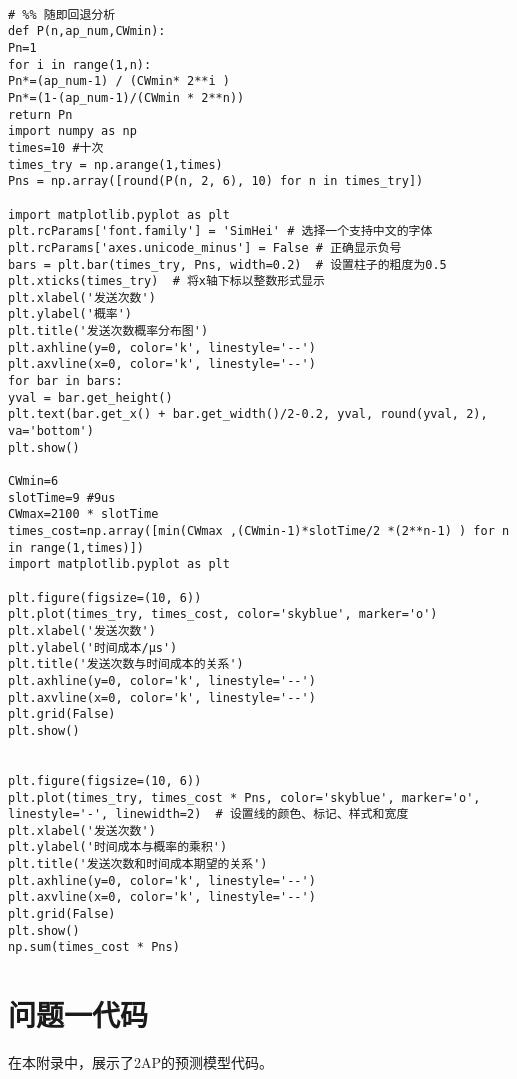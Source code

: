 \documentclass[bwprint,fontset=windows]{gmcmthesis}
\begin{document}
\begin{lstlisting}

# %% 随即回退分析
def P(n,ap_num,CWmin):
Pn=1
for i in range(1,n):
Pn*=(ap_num-1) / (CWmin* 2**i )
Pn*=(1-(ap_num-1)/(CWmin * 2**n))
return Pn
import numpy as np
times=10 #十次
times_try = np.arange(1,times)
Pns = np.array([round(P(n, 2, 6), 10) for n in times_try])

import matplotlib.pyplot as plt
plt.rcParams['font.family'] = 'SimHei' # 选择一个支持中文的字体
plt.rcParams['axes.unicode_minus'] = False # 正确显示负号
bars = plt.bar(times_try, Pns, width=0.2)  # 设置柱子的粗度为0.5
plt.xticks(times_try)  # 将x轴下标以整数形式显示
plt.xlabel('发送次数')
plt.ylabel('概率')
plt.title('发送次数概率分布图')
plt.axhline(y=0, color='k', linestyle='--')
plt.axvline(x=0, color='k', linestyle='--')
for bar in bars:
yval = bar.get_height()
plt.text(bar.get_x() + bar.get_width()/2-0.2, yval, round(yval, 2), va='bottom')
plt.show()

CWmin=6
slotTime=9 #9us
CWmax=2100 * slotTime
times_cost=np.array([min(CWmax ,(CWmin-1)*slotTime/2 *(2**n-1) ) for n in range(1,times)])
import matplotlib.pyplot as plt

plt.figure(figsize=(10, 6))
plt.plot(times_try, times_cost, color='skyblue', marker='o')
plt.xlabel('发送次数')
plt.ylabel('时间成本/μs')
plt.title('发送次数与时间成本的关系')
plt.axhline(y=0, color='k', linestyle='--')
plt.axvline(x=0, color='k', linestyle='--')
plt.grid(False)
plt.show()


plt.figure(figsize=(10, 6))
plt.plot(times_try, times_cost * Pns, color='skyblue', marker='o', linestyle='-', linewidth=2)  # 设置线的颜色、标记、样式和宽度
plt.xlabel('发送次数')
plt.ylabel('时间成本与概率的乘积')
plt.title('发送次数和时间成本期望的关系')
plt.axhline(y=0, color='k', linestyle='--')
plt.axvline(x=0, color='k', linestyle='--')
plt.grid(False)
plt.show()
np.sum(times_cost * Pns)
\end{lstlisting}


\section{问题一代码}

\noindent 在本附录中，展示了2AP的预测模型代码。
\end{document}
